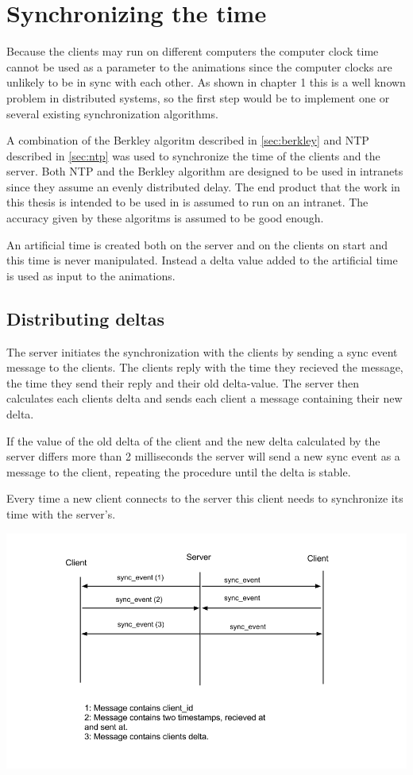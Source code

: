 \section{Synchronizing the time}

Because the clients may run on different computers the computer clock time cannot be used as a parameter to the animations since the computer clocks are unlikely to be in sync with each other. As shown in chapter 1 this is a well known problem in distributed systems, so the first step would be to implement one or several existing synchronization algorithms. 

A combination of the Berkley algoritm described in \ref{sec:berkley} and NTP described in \ref{sec:ntp} was used to synchronize the time of the clients and the server. Both NTP and the Berkley algorithm are designed to be used in intranets since they assume an evenly distributed delay. The end product that the work in this thesis is intended to be used in is assumed to run on an intranet. The accuracy given by these algoritms is assumed to be good enough. 

An artificial time is created both on the server and on the clients on start and this time is never manipulated. Instead a delta value added to the artificial time is used as input to the animations.  

\subsection {Distributing deltas}

The server initiates the synchronization with the clients by sending a sync event message to the clients. The clients reply with the time they recieved the message, the time they send their reply and their old delta-value. The server then calculates each clients delta and sends each client a message containing their new delta. 

If the value of the old delta of the client and the new delta calculated by the server differs more than 2 milliseconds the server will send a new sync event as a message to the client, repeating the procedure until the delta is stable. 

Every time a new client connects to the server this client needs to synchronize its time with the server's. 

\includegraphics[width=1.0\textwidth]{figures/comm.png}

